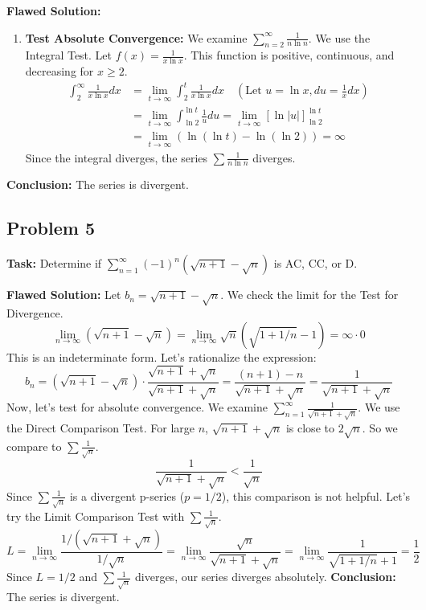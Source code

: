 \documentclass{article}
\begin{document}
\textbf{Flawed Solution:}
\begin{enumerate}
    \item \textbf{Test Absolute Convergence:} We examine $\sum_{n=2}^{\infty} \frac{1}{n \ln n}$. We use the Integral Test. Let $f(x) = \frac{1}{x \ln x}$. This function is positive, continuous, and decreasing for $x \ge 2$.
    \begin{align*}
        \int_2^\infty \frac{1}{x \ln x} dx &= \lim_{t \to \infty} \int_2^t \frac{1}{x \ln x} dx \quad (\text{Let } u = \ln x, du = \frac{1}{x} dx) \\
        &= \lim_{t \to \infty} \int_{\ln 2}^{\ln t} \frac{1}{u} du = \lim_{t \to \infty} [\ln|u|]_{\ln 2}^{\ln t} \\
        &= \lim_{t \to \infty} (\ln(\ln t) - \ln(\ln 2)) = \infty
    \end{align*}
    Since the integral diverges, the series $\sum \frac{1}{n \ln n}$ diverges.
\end{enumerate}
\textbf{Conclusion:} The series is divergent.

\subsection*{Problem 5}
\textbf{Task:} Determine if $\sum_{n=1}^{\infty} (-1)^n (\sqrt{n+1} - \sqrt{n})$ is AC, CC, or D.

\textbf{Flawed Solution:}
Let $b_n = \sqrt{n+1} - \sqrt{n}$. We check the limit for the Test for Divergence.
\[ \lim_{n \to \infty} (\sqrt{n+1} - \sqrt{n}) = \lim_{n \to \infty} \sqrt{n} (\sqrt{1+1/n} - 1) = \infty \cdot 0 \]
This is an indeterminate form. Let's rationalize the expression:
\[ b_n = (\sqrt{n+1} - \sqrt{n}) \cdot \frac{\sqrt{n+1} + \sqrt{n}}{\sqrt{n+1} + \sqrt{n}} = \frac{(n+1) - n}{\sqrt{n+1} + \sqrt{n}} = \frac{1}{\sqrt{n+1} + \sqrt{n}} \]
Now, let's test for absolute convergence. We examine $\sum_{n=1}^{\infty} \frac{1}{\sqrt{n+1} + \sqrt{n}}$.
We use the Direct Comparison Test. For large $n$, $\sqrt{n+1}+\sqrt{n}$ is close to $2\sqrt{n}$.
So we compare to $\sum \frac{1}{\sqrt{n}}$.
\[ \frac{1}{\sqrt{n+1} + \sqrt{n}} < \frac{1}{\sqrt{n}} \]
Since $\sum \frac{1}{\sqrt{n}}$ is a divergent p-series ($p=1/2$), this comparison is not helpful.
Let's try the Limit Comparison Test with $\sum \frac{1}{\sqrt{n}}$.
\[ L = \lim_{n \to \infty} \frac{1/(\sqrt{n+1}+\sqrt{n})}{1/\sqrt{n}} = \lim_{n \to \infty} \frac{\sqrt{n}}{\sqrt{n+1}+\sqrt{n}} = \lim_{n \to \infty} \frac{1}{\sqrt{1+1/n}+1} = \frac{1}{2} \]
Since $L=1/2$ and $\sum \frac{1}{\sqrt{n}}$ diverges, our series diverges absolutely.
\textbf{Conclusion:} The series is divergent.
\end{document}
